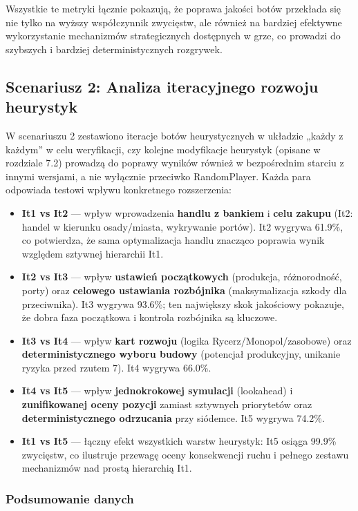 \documentclass[polish,inz,longabstract]{iithesis}
\begin{document}
Wszystkie te metryki łącznie pokazują, że poprawa jakości botów przekłada się nie tylko na wyższy współczynnik zwycięstw, ale również na bardziej efektywne wykorzystanie mechanizmów strategicznych dostępnych w grze, co prowadzi do szybszych i bardziej deterministycznych rozgrywek.

\subsection{Scenariusz 2: Analiza iteracyjnego rozwoju heurystyk}

W scenariuszu 2 zestawiono iteracje botów heurystycznych w układzie „każdy z każdym” w celu weryfikacji, czy kolejne modyfikacje heurystyk (opisane w rozdziale 7.2) prowadzą do poprawy wyników również w bezpośrednim starciu z innymi wersjami, a nie wyłącznie przeciwko RandomPlayer. Każda para odpowiada testowi wpływu konkretnego rozszerzenia:

\begin{itemize}
\item \textbf{It1 vs It2} --- wpływ wprowadzenia \textbf{handlu z bankiem} i \textbf{celu zakupu} (It2: handel w kierunku osady/miasta, wykrywanie portów). It2 wygrywa 61.9\%, co potwierdza, że sama optymalizacja handlu znacząco poprawia wynik względem sztywnej hierarchii It1.
\item \textbf{It2 vs It3} --- wpływ \textbf{ustawień początkowych} (produkcja, różnorodność, porty) oraz \textbf{celowego ustawiania rozbójnika} (maksymalizacja szkody dla przeciwnika). It3 wygrywa 93.6\%; ten największy skok jakościowy pokazuje, że dobra faza początkowa i kontrola rozbójnika są kluczowe.
\item \textbf{It3 vs It4} --- wpływ \textbf{kart rozwoju} (logika Rycerz/Monopol/zasobowe) oraz \textbf{deterministycznego wyboru budowy} (potencjał produkcyjny, unikanie ryzyka przed rzutem 7). It4 wygrywa 66.0\%.
\item \textbf{It4 vs It5} --- wpływ \textbf{jednokrokowej symulacji} (lookahead) i \textbf{zunifikowanej oceny pozycji} zamiast sztywnych priorytetów oraz \textbf{deterministycznego odrzucania} przy siódemce. It5 wygrywa 74.2\%.
\item \textbf{It1 vs It5} --- łączny efekt wszystkich warstw heurystyk: It5 osiąga 99.9\% zwycięstw, co ilustruje przewagę oceny konsekwencji ruchu i pełnego zestawu mechanizmów nad prostą hierarchią It1.
\end{itemize}

\subsubsection{Podsumowanie danych}
\end{document}

